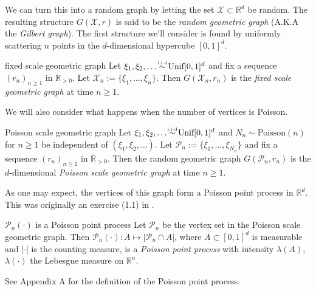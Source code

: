 \documentclass{article}
\newcommand\iidsim{\stackrel{\mathclap{\tiny\mbox{i.i.d}}}{\sim}}
\begin{document}
We can turn this into a random graph by letting the set $\mathcal{X} \subset \mathbb{R}^d$ be random. The resulting
structure $G(\mathcal{X}, r)$ is said to be the {\it random geometric graph} (A.K.A the {\it Gilbert graph}). The first 
structure we'll consider is found by uniformly scattering $n$ points in the $d$-dimensional hypercube $[0,1]^d$. 

\begin{example}[]{fixed scale geometric graph}
    Let $\xi_1, \xi_2, \dots \iidsim \text{Unif}[0,1]^d$ and fix a sequence $(r_n)_{n \geq 1}$ in $\mathbb{R}_{>0}$.
    Let $\mathcal{X}_n := \{\xi_1, \dots, \xi_n\}$. Then $G(\mathcal{X}_n, r_n)$ is the {\it fixed scale geometric 
    graph} at time $n \geq 1$.
\end{example}

We will also consider what happens when the number of vertices is Poisson.

\begin{example}[]{Poisson scale geometric graph}
    Let $\xi_1, \xi_2, \dots \iidsim \text{Unif}[0,1]^d$ and $N_n \sim \text{Poisson}(n)$ for $n \geq 1$ be independent 
    of $(\xi_1, \xi_2, \dots)$. Let $\mathcal{P}_n := \{\xi_1, \dots, \xi_{N_n}\}$ and fix a sequence $(r_n)_{n \geq 1}$
    in $\mathbb{R}_{> 0}$. Then the random geometric graph $G(\mathcal{P}_n, r_n)$ is the $d$-dimensional {\it Poisson 
    scale geometric graph} at time $n \geq 1$. 
\end{example}

As one may expect, the vertices of this graph form a Poisson point process in $\mathbb{R}^d$. This was originally 
an exercise (1.1) in \cite{Penrose_et_al_2016}.

\begin{proposition}[]{$\mathcal{P}_n(\cdot)$ is a Poisson point process}
    Let $\mathcal{P}_n$ be the vertex set in the Poisson scale geometric graph. Then $\mathcal{P}_n(\cdot): A \mapsto 
    |\mathcal{P}_n \cap A|$, where $A \subset [0,1]^d$ is measurable and $|\cdot|$ is the counting measure, is a 
    {\it Poisson point process} with intensity $\lambda(A)$, $\lambda(\cdot)$ the Lebesgue measure on $\mathbb{R}^n$.
\end{proposition}

See Appendix A for the definition of the Poisson point process. 
\end{document}
